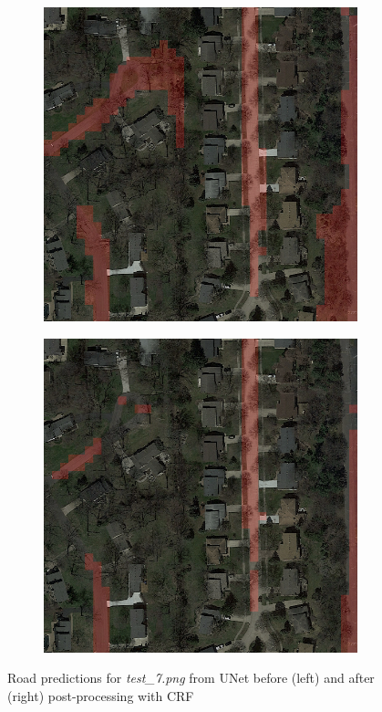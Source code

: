 \documentclass[10pt,conference,compsocconf]{IEEEtran}
\begin{document}
\begin{figure}[ht]
  \centering
  \captionsetup{justification=centering}
  \begin{subfigure}{.4\columnwidth}
    \includegraphics[width=\linewidth]{images/test_7_unet_beforepp.png}
  \end{subfigure}
  \begin{subfigure}{.4\columnwidth}
    \includegraphics[width=\linewidth]{images/test_7_unet_afterpp.png}
  \end{subfigure}
  \caption{Road predictions for \textit{test\_7.png} from UNet before (left) and after (right) post-processing with CRF}
  \label{fig:crf-comp}
\end{figure}
\end{document}
